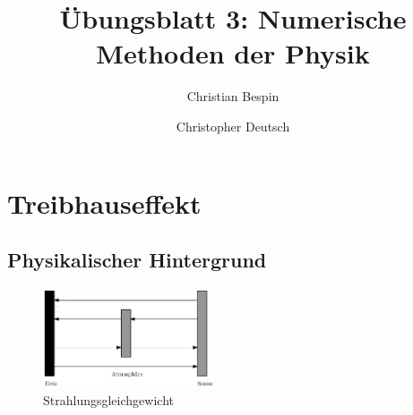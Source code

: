 \documentclass[10pt,a4paper]{article}
\author{Christian Bespin \and Christopher Deutsch}
\title{Übungsblatt 3: Numerische Methoden der Physik}
\begin{document}
\maketitle

\setcounter{section}{1}

\section{Treibhauseffekt}

\subsection{Physikalischer Hintergrund}

\begin{figure}
\centering
\includegraphics[width=0.45\textwidth]{./figures/strahlungsgleichgewicht.eps}
\caption{Strahlungsgleichgewicht}
\label{fig:strahlungsgleichgewicht}
\end{figure}
\end{document}

